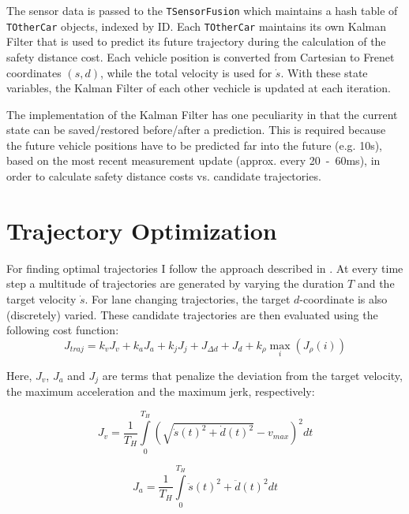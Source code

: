 \documentclass[twoside]{article}
\newcommand{\code}[1]{{\texttt{#1}}}
\begin{document}
The sensor data is passed to the \code{TSensorFusion} which maintains a hash table of
\code{TOtherCar} objects, indexed by ID. Each \code{TOtherCar} maintains its own Kalman Filter that is used to predict its future trajectory during the calculation of the safety distance cost. Each vehicle position is converted from Cartesian to Frenet coordinates $(s,d)$, while the total velocity is used for $\dot s$. With these state variables, the Kalman Filter of each other vechicle is updated at each iteration.

The implementation of the Kalman Filter has one peculiarity in that the current state can
be saved/restored before/after a prediction. This is required because the future vehicle positions have to be predicted far into the future (e.g. 10s), based on the most
recent measurement update (approx. every 20~-~60ms), in order to calculate safety distance
costs vs. candidate trajectories.
\section{Trajectory Optimization}
For finding optimal trajectories I follow the approach described in \cite{werling2010optimal}.
At every time step a multitude of trajectories are generated by varying the duration $T$ and
the target velocity $\dot s$. For lane changing trajectories, the target $d$-coordinate is also
(discretely) varied. These candidate trajectories are then evaluated using the following
cost function:
\begin{equation}
J_{traj} = k_v J_{v} + k_a J_{a} + k_j J_{j} + J_{\Delta d} + J_{d} + k_{\rho} \underset{i}\max(J_{\rho}(i))
\end{equation}

Here, $J_{v}$, $J_{a}$ and $J_{j}$ are terms that penalize the deviation from the target velocity,
the maximum acceleration and the maximum jerk, respectively:

\begin{equation}
J_{v} = \frac{1}{T_H}\int\limits_0^{T_{H}} \left(\sqrt{\dot s(t)^2 + \dot d(t)^2} - v_{max}\right)^2 dt
\end{equation}

\begin{equation}
J_{a} = \frac{1}{T_H}\int\limits_0^{T_{H}}\ddot s(t)^2 + \ddot d(t)^2 dt
\end{equation}
\end{document}
